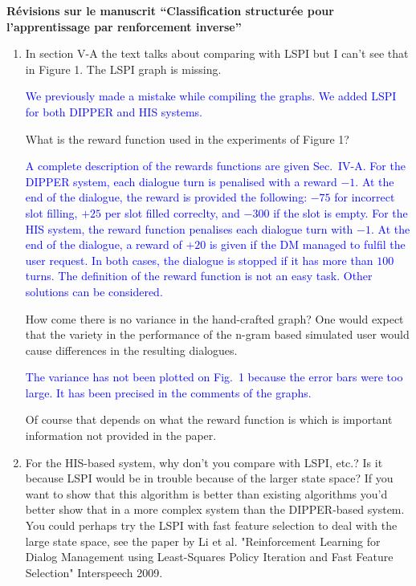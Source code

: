 \documentclass[11pt, a4paper]{letter}
\begin{document}
\begin{letter}{\large \textbf{Révisions sur le manuscrit ``Classification structurée pour l'apprentissage par renforcement inverse''}}
\begin{enumerate}
\textcolor{blue}{We precised in Sec.~V-B how the handcrafted policy
works. For the DIPPER system, a set of hand crafted rules prevents
the system from choosing actions inconsistent with the current
dialogue state. For example, it avoids to confirm a slot while it
has never has been asked before.}

\item In section V-A the text talks about comparing with LSPI but I can't see
 that in Figure 1. The LSPI graph is missing.

\textcolor{blue}{ We previously made a mistake while compiling the
graphs. We added LSPI for both DIPPER and HIS systems.}

What is the reward function
 used in the experiments of Figure 1?

\textcolor{blue}{A complete description of the rewards functions are
given Sec.~IV-A. For the DIPPER system, each dialogue turn is
penalised with a reward $-1$. At the end of the dialogue, the reward
is provided the following: $-75$ for incorrect slot filling,  $+25$
per slot filled correclty, and $-300$ if the slot is empty. For the
HIS system, the reward function penalises each dialogue turn with
$-1$. At the end of the dialogue, a reward of $+20$ is given if the
DM managed to fulfil the user request. In both cases, the dialogue
is stopped if it has more than $100$ turns. The definition of the
reward function is not an easy task. Other solutions can be
considered.}



 How come there is no variance in the
 hand-crafted graph? One would expect that the variety in the performance of
 the n-gram based simulated user would cause differences in the resulting
 dialogues.

\textcolor{blue}{The variance has not been plotted on Fig.~1 because
the error bars were too large. It has been precised in the comments
of the graphs.}

Of course that depends on what the reward function is which is
 important information not provided in the paper.

\item  For the HIS-based system, why don't you compare with LSPI, etc.? Is it
 because LSPI would be in trouble because of the larger state space? If you
 want to show that this algorithm is better than existing algorithms you'd
 better show that in a more complex system than the DIPPER-based system. You
 could perhaps try the LSPI with fast feature selection to deal with the
 large state space, see the paper by Li et al. "Reinforcement Learning for
 Dialog Management using Least-Squares Policy Iteration and Fast Feature
 Selection" Interspeech 2009.


\end{enumerate}
\end{letter}
\end{document}
